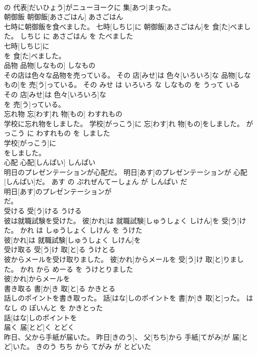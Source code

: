 \documentclass[8pt]{extreport}
\begin{document}
\begin{CJK}{UTF8}{min}
\\	の 代表[だいひょう]がニューヨークに 集[あつ]まった。			
\\	朝御飯	朝御飯[あさごはん]	あさごはん	
\\	七時に朝御飯を食べました。	七時[しちじ]に 朝御飯[あさごはん]を 食[た]べました。	しちじ に あさごはん を たべました	
\\	七時[しちじ]に
\\	を 食[た]べました。			
\\	品物	品物[しなもの]	しなもの	
\\	その店は色々な品物を売っている。	その 店[みせ]は 色々[いろいろ]な 品物[しなもの]を 売[う]っている。	その みせ は いろいろ な しなもの を うって いる	
\\	その 店[みせ]は 色々[いろいろ]な
\\	を 売[う]っている。			
\\	忘れ物	忘[わす]れ 物[もの]	わすれもの	
\\	学校に忘れ物をしました。	学校[がっこう]に 忘[わす]れ 物[もの]をしました。	がっこう に わすれもの を しました	
\\	学校[がっこう]に
\\	をしました。			
\\	心配	心配[しんぱい]	しんぱい	
\\	明日のプレゼンテーションが心配だ。	明日[あす]のプレゼンテーションが 心配[しんぱい]だ。	あす の ぷれぜんてーしょん が しんぱい だ	
\\	明日[あす]のプレゼンテーションが
\\	だ。			
\\	受ける	受[う]ける	うける	
\\	彼は就職試験を受けた。	彼[かれ]は 就職試験[しゅうしょく しけん]を 受[う]けた。	かれ は しゅうしょく しけん を うけた	
\\	彼[かれ]は 就職試験[しゅうしょく しけん]を
\\	受け取る	受[う]け 取[と]る	うけとる	
\\	彼からメールを受け取りました。	彼[かれ]からメールを 受[う]け 取[と]りました。	かれ から めーる を うけとりました	
\\	彼[かれ]からメールを
\\	書き取る	書[か]き 取[と]る	かきとる	
\\	話しのポイントを書き取った。	話[はな]しのポイントを 書[か]き 取[と]った。	はなし の ぽいんと を かきとった	
\\	話[はな]しのポイントを
\\	届く	届[とど]く	とどく	
\\	昨日、父から手紙が届いた。	昨日[きのう]、 父[ちち]から 手紙[てがみ]が 届[とど]いた。	きのう ちち から てがみ が とどいた	

\end{CJK}
\end{document}
